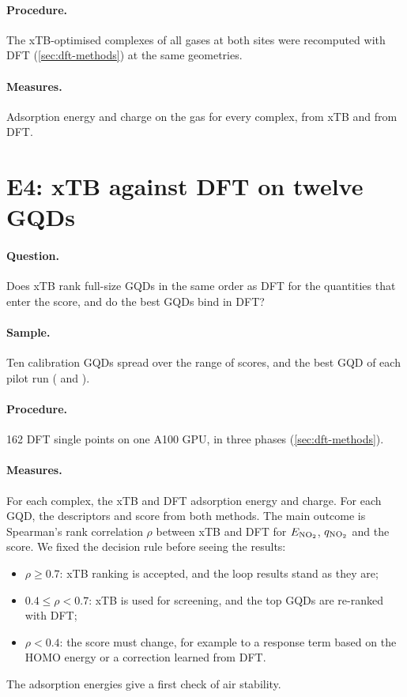 \paragraph{Procedure.} The xTB-optimised complexes of all gases at both sites were recomputed with
DFT (\cref{sec:dft-methods}) at the same geometries.

\paragraph{Measures.} Adsorption energy and charge on the gas for every complex, from xTB and from
DFT.

\section{E4: xTB against DFT on twelve GQDs}
\label{sec:e4}

\paragraph{Question.} Does xTB rank full-size GQDs in the same order as DFT for the quantities
that enter the score, and do the best GQDs bind  in DFT?

\paragraph{Sample.} Ten calibration GQDs spread over the range of scores, and the best GQD of each
pilot run ( and ).

\paragraph{Procedure.} 162 DFT single points on one A100 GPU, in three phases
(\cref{sec:dft-methods}).

\paragraph{Measures.} For each complex, the xTB and DFT adsorption energy and charge. For each GQD,
the descriptors and score from both methods. The main outcome is Spearman's rank correlation
\(\rho\) \cite{spearman1904} between xTB and DFT for \(E_{\ce{NO2}}\), \(q_{\ce{NO2}}\) and the
score. We fixed the decision rule before seeing the results:
\begin{itemize}
  \item \(\rho \geq 0.7\): xTB ranking is accepted, and the loop results stand as they are;
  \item \(0.4 \leq \rho < 0.7\): xTB is used for screening, and the top GQDs are re-ranked with
        DFT;
  \item \(\rho < 0.4\): the score must change, for example to a response term based on the HOMO
        energy or a correction learned from DFT.
\end{itemize}
The  adsorption energies give a first check of air stability.

